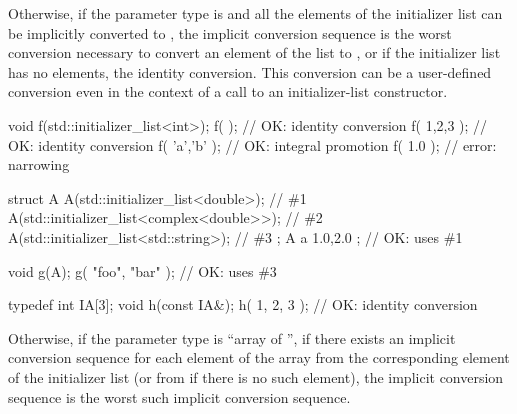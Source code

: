 \pnum
Otherwise, if the parameter type is 
and all the elements
of the initializer list can be implicitly converted to , the implicit
conversion sequence is the worst conversion necessary to convert an element of
the list to , or if the initializer list has no elements, the identity
conversion. This conversion can be a user-defined conversion even in
the context of a call to an initializer-list constructor. \begin{example}
\begin{codeblock}
void f(std::initializer_list<int>);
f( {} );                    // OK:  identity conversion
f( {1,2,3} );               // OK:  identity conversion
f( {'a','b'} );             // OK:  integral promotion
f( {1.0} );                 // error: narrowing

struct A {
  A(std::initializer_list<double>);           // \#1
  A(std::initializer_list<complex<double>>);  // \#2
  A(std::initializer_list<std::string>);      // \#3
};
A a{ 1.0,2.0 };             // OK: uses \#1

void g(A);
g({ "foo", "bar" });        // OK: uses \#3

typedef int IA[3];
void h(const IA&);
h({ 1, 2, 3 });             // OK: identity conversion
\end{codeblock}
\end{example}

\pnum
Otherwise, if the parameter type is ``array of  '',
if there exists an implicit conversion sequence for each element of the array
from the corresponding element of the initializer list (or from \tcode{\{\}}
if there is no such element), the implicit conversion sequence is
the worst such implicit conversion sequence.

